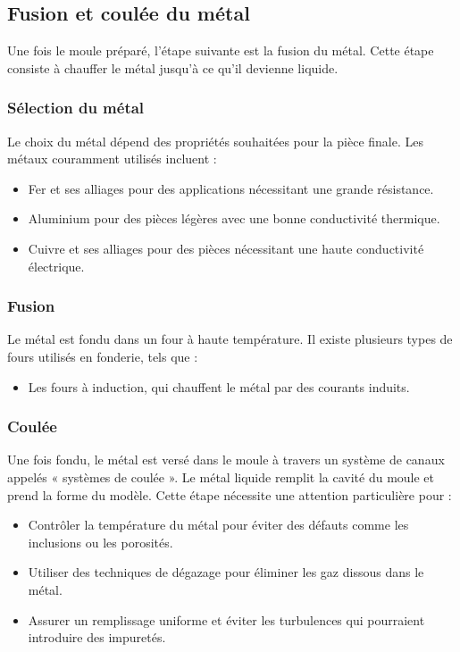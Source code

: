 \documentclass[12pt]{article}
\begin{document}
\subsection{Fusion et coulée du métal}
Une fois le moule préparé, l'étape suivante est la fusion du métal. Cette étape consiste à chauffer le métal jusqu'à ce qu'il devienne liquide.

\subsubsection{Sélection du métal}
Le choix du métal dépend des propriétés souhaitées pour la pièce finale. Les métaux couramment utilisés incluent :

\begin{itemize}
    \item Fer et ses alliages pour des applications nécessitant une grande résistance.
    \item Aluminium pour des pièces légères avec une bonne conductivité thermique.
    \item Cuivre et ses alliages pour des pièces nécessitant une haute conductivité électrique.
\end{itemize}

\subsubsection{Fusion}
Le métal est fondu dans un four à haute température. Il existe plusieurs types de fours utilisés en fonderie, tels que :

\begin{itemize}
    \item Les fours à induction, qui chauffent le métal par des courants induits.
\end{itemize}

\subsubsection{Coulée}
Une fois fondu, le métal est versé dans le moule à travers un système de canaux appelés « systèmes de coulée ». Le métal liquide remplit la cavité du moule et prend la forme du modèle. Cette étape nécessite une attention particulière pour :

\begin{itemize}
    \item Contrôler la température du métal pour éviter des défauts comme les inclusions ou les porosités.
    \item Utiliser des techniques de dégazage pour éliminer les gaz dissous dans le métal.
    \item Assurer un remplissage uniforme et éviter les turbulences qui pourraient introduire des impuretés.
\end{itemize}
\end{document}
